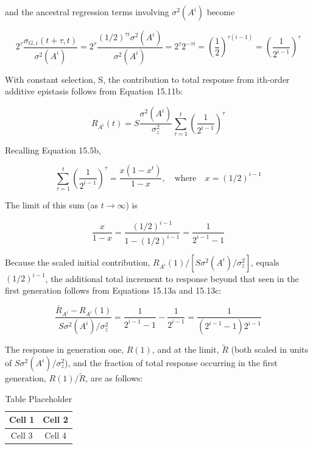 \documentclass{article}
\begin{document}
and the ancestral regression terms involving  $ \sigma^{2}(A^{i}) $ become

\begin{equation}
2^{\tau}\frac{\sigma_{G,i}(t+\tau,t)}{\sigma^{2}(A^{i})}=2^{\tau}\frac{(1/2)^{\tau i}\sigma^{2}(A^{i})}{\sigma^{2}(A^{i})}=2^{\tau}2^{-\tau i}=\left(\frac{1}{2}\right)^{\tau(i-1)}=\left(\frac{1}{2^{i-1}}\right)^{\tau}
\end{equation}

With constant selection, S, the contribution to total response from ith-order additive epistasis follows from Equation 15.11b:

\begin{equation}
R_{A^{i}}(t)=S\frac{\sigma^{2}(A^{i})}{\sigma_{z}^{2}}\sum_{\tau=1}^{t}\left(\frac{1}{2^{i-1}}\right)^{\tau}
\tag{15.13a}
\label{eq:15_13a}
\end{equation}

Recalling Equation 15.5b,

\begin{equation}
\sum_{\tau=1}^{t}\left(\frac{1}{2^{i-1}}\right)^{\tau}=\frac{x(1-x^{t})}{1-x},\quad\mathrm{w h e r e}\quad x=(1/2)^{i-1}
\tag{15.13b}
\label{eq:15_13b}
\end{equation}

The limit of this sum (as  $ t \to \infty $) is

\begin{equation}
\frac{x}{1-x}=\frac{(1/2)^{i-1}}{1-(1/2)^{i-1}}=\frac{1}{2^{i-1}-1}
\tag{15.13c}
\label{eq:15_13c}
\end{equation}

Because the scaled initial contribution,  $ R_{A^{i}}(1)/[S\sigma^{2}(A^{i})/\sigma_{z}^{2}] $, equals  $ (1/2)^{i-1} $, the additional total increment to response beyond that seen in the first generation follows from Equations 15.13a and 15.13c:

\begin{equation}
\frac{\bar{R}_{A^{i}}-R_{A^{i}}(1)}{S\sigma^{2}(A^{i})/\sigma_{z}^{2}}=\frac{1}{2^{i-1}-1}-\frac{1}{2^{i-1}}=\frac{1}{(2^{i-1}-1)2^{i-1}}
\end{equation}

The response in generation one,  $ R(1) $, and at the limit,  $ \tilde{R} $ (both scaled in units of  $ S\sigma^{2}(A^{i})/\sigma_{z}^{2} $), and the fraction of total response occurring in the first generation,  $ R(1)/\tilde{R} $, are as follows:

\begin{table}[h]
\centering
\begin{tabular}{|c|c|}
\hline
Cell 1 & Cell 2 \\
\hline
Cell 3 & Cell 4 \\
\hline
\end{tabular}
\caption{Table Placeholder}
\end{table}
\end{document}

